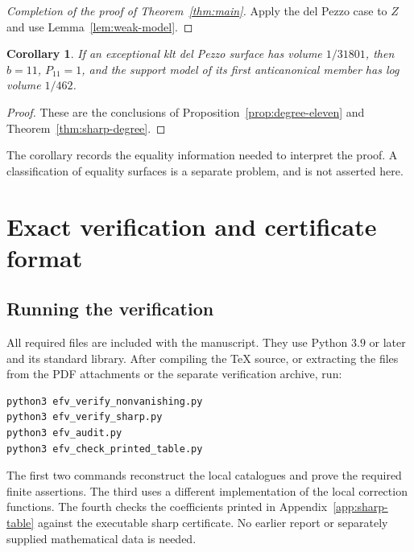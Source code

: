 \documentclass[12pt,a4paper]{article}
\numberwithin{equation}{section}
\newtheorem{corollary}[theorem]{Corollary}
\theoremstyle{definition}
\begin{document}
\begin{proof}[Completion of the proof of Theorem~\ref{thm:main}]
Apply the del Pezzo case to \(Z\) and use
Lemma~\ref{lem:weak-model}.
\end{proof}

\begin{corollary}\label{cor:equality}
If an exceptional klt del Pezzo surface has volume \(1/31801\),
then \(b=11\), \(P_{11}=1\), and the support model of its first
anticanonical member has log volume \(1/462\).
\end{corollary}
\begin{proof}
These are the conclusions of Proposition~\ref{prop:degree-eleven}
and Theorem~\ref{thm:sharp-degree}.
\end{proof}

The corollary records the equality information needed to interpret
the proof. A classification of equality surfaces is a separate
problem, and is not asserted here.

\appendix
\section{Exact verification and certificate format}\label{app:verification}

\subsection{Running the verification}

All required files are included with the manuscript.
They use Python \(3.9\) or later and its standard library.
After compiling the TeX source, or extracting the files from the PDF
attachments or the separate verification archive, run:
\begin{lstlisting}
python3 efv_verify_nonvanishing.py
python3 efv_verify_sharp.py
python3 efv_audit.py
python3 efv_check_printed_table.py
\end{lstlisting}
The first two commands reconstruct the local catalogues and prove
the required finite assertions. The third uses a different
implementation of the local correction functions. The fourth
checks the coefficients printed in Appendix~\ref{app:sharp-table}
against the executable sharp certificate.
No earlier report or separately supplied mathematical data is needed.
\end{document}
